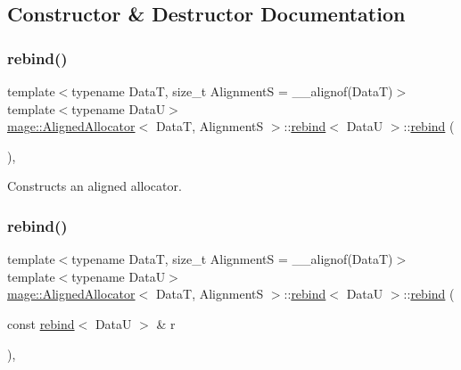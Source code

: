 \subsection{Constructor \& Destructor Documentation}
\hypertarget{structmage_1_1_aligned_allocator_1_1rebind_a2b26e5afbed6b26f73ed0186c2ff52d6}{}\label{structmage_1_1_aligned_allocator_1_1rebind_a2b26e5afbed6b26f73ed0186c2ff52d6} 
\subsubsection{\texorpdfstring{rebind()}{rebind()}\hspace{0.1cm}{\footnotesize\ttfamily [1/3]}}
{\footnotesize\ttfamily template$<$typename DataT, size\+\_\+t AlignmentS = \+\_\+\+\_\+alignof(\+Data\+T)$>$ \\
template$<$typename DataU$>$ \\
\hyperlink{structmage_1_1_aligned_allocator}{mage\+::\+Aligned\+Allocator}$<$ DataT, AlignmentS $>$\+::\hyperlink{structmage_1_1_aligned_allocator_1_1rebind}{rebind}$<$ DataU $>$\+::\hyperlink{structmage_1_1_aligned_allocator_1_1rebind}{rebind} (\begin{DoxyParamCaption}{ }\end{DoxyParamCaption})\hspace{0.3cm}{\ttfamily [private]}, {\ttfamily [delete]}}

Constructs an aligned allocator. \hypertarget{structmage_1_1_aligned_allocator_1_1rebind_ad3132b0e4a5661ccb9fb33283ea4003e}{}\label{structmage_1_1_aligned_allocator_1_1rebind_ad3132b0e4a5661ccb9fb33283ea4003e} 
\subsubsection{\texorpdfstring{rebind()}{rebind()}\hspace{0.1cm}{\footnotesize\ttfamily [2/3]}}
{\footnotesize\ttfamily template$<$typename DataT, size\+\_\+t AlignmentS = \+\_\+\+\_\+alignof(\+Data\+T)$>$ \\
template$<$typename DataU$>$ \\
\hyperlink{structmage_1_1_aligned_allocator}{mage\+::\+Aligned\+Allocator}$<$ DataT, AlignmentS $>$\+::\hyperlink{structmage_1_1_aligned_allocator_1_1rebind}{rebind}$<$ DataU $>$\+::\hyperlink{structmage_1_1_aligned_allocator_1_1rebind}{rebind} (\begin{DoxyParamCaption}\item[{const \hyperlink{structmage_1_1_aligned_allocator_1_1rebind}{rebind}$<$ DataU $>$ \&}]{r }\end{DoxyParamCaption})\hspace{0.3cm}{\ttfamily [private]}, {\ttfamily [delete]}}

